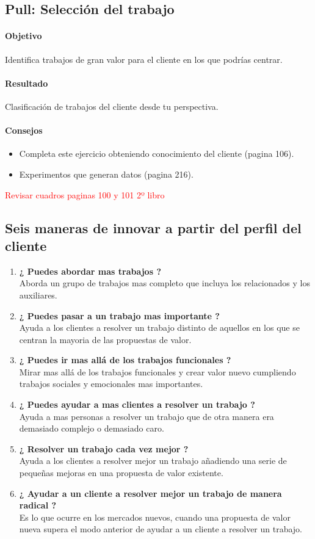 \documentclass[11pt]{book}
\begin{document}
\subsection{Pull: Selección del trabajo}
\paragraph{Objetivo}
Identifica trabajos de gran valor para el cliente en los que podrías centrar.
\paragraph{Resultado}
Clasificación de trabajos del cliente desde tu perspectiva.
\paragraph{Consejos}
\begin{itemize}
\item Completa este ejercicio obteniendo conocimiento del cliente (pagina 106). 
\item Experimentos que generan datos (pagina 216).
\end{itemize}
\textcolor{red}{Revisar cuadros paginas 100 y 101 2º libro}
\subsection{Seis maneras de innovar a partir del perfil del cliente}
\begin{enumerate}
\item \textbf{ ¿ Puedes abordar mas trabajos ? }\\
Aborda un grupo de trabajos mas completo que incluya los relacionados y los auxiliares.
\item \textbf{ ¿ Puedes pasar a un trabajo mas importante ? }\\
Ayuda a los clientes a resolver un trabajo distinto de aquellos en los que se centran la mayoria de las propuestas de valor.
\item \textbf{ ¿ Puedes ir mas allá de los trabajos funcionales ? }\\
Mirar mas allá de los trabajos funcionales y crear valor nuevo cumpliendo trabajos sociales y emocionales mas importantes.
\item \textbf{ ¿ Puedes ayudar a mas clientes a resolver un trabajo ? }\\
Ayuda a mas personas a resolver un trabajo que de otra manera era demasiado complejo o demasiado caro.
\item \textbf{ ¿ Resolver un trabajo cada vez mejor ? }\\
Ayuda a los clientes a resolver mejor un trabajo añadiendo una serie de pequeñas mejoras en una propuesta de valor existente.
\item \textbf{ ¿ Ayudar a un cliente a resolver mejor un trabajo de manera radical ? }\\
Es lo que ocurre en los mercados nuevos, cuando una propuesta de valor nueva supera el modo anterior de ayudar a un cliente a resolver un trabajo.
\end{enumerate}
\end{document}

